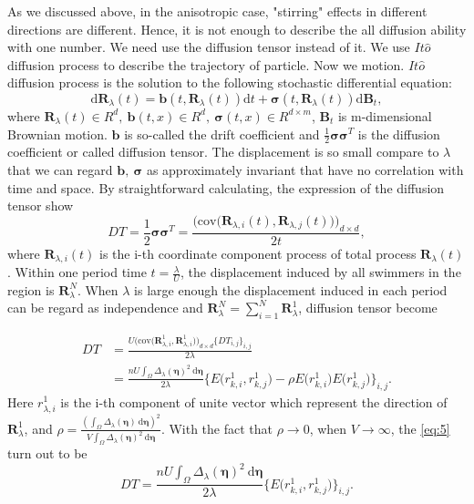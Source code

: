 \documentclass[12pt,a4paper]{article}
\begin{document}
As we discussed above, in the anisotropic case, "stirring" effects in
different directions are different. Hence, it is not enough to
describe the all diffusion ability with one number. We need use the
diffusion tensor instead of it. We use $It\hat{o}$ diffusion process
to describe the trajectory of particle. Now we motion. $It\hat{o}$
diffusion process is the solution to the following stochastic
differential equation:
\begin{equation}
  \label{eq:3}
  \mathrm{d}\bm{R}_{\lambda}(t)=\bm{b}(t,\bm{R}_{\lambda}(t))\mathrm{d}t+\bm{\sigma}(t,\bm{R}_{\lambda}(t))\mathrm{d}\bm{B}_{t},
\end{equation}
where $\bm{R}_{\lambda}(t)\in R^{d},\ \bm{b}(t,x)\in R^{d},\ \bm{\sigma}(t,x)\in R^{d\times
  m}$, $\bm{B}_{t}$ is m-dimensional Brownian motion. $\bm{b}$ is
so-called the drift coefficient and $\frac{1}{2}\bm{\sigma}\bm{\sigma}^{T}$ is
the diffusion coefficient or called diffusion tensor. The displacement
is so small compare to $\lambda$ that we can regard $\bm{b},\ \bm{\sigma}$ as
approximately invariant that have no correlation with time and
space. By straightforward calculating, the expression of the diffusion
tensor show
\begin{equation}
  \label{eq:4}
  DT=\frac{1}{2}\bm{\sigma}\bm{\sigma}^{T}=\frac{\Big(\mathrm{cov}\Big(\bm{R}_{\lambda,i}(t),
        \bm{R}_{\lambda,j}(t)\Big)\Big)_{d\times d}}{2t},
\end{equation}
where $\bm{R}_{\lambda,i}(t)$ is the i-th coordinate component process of
total process $\bm{R}_{\lambda}(t)$. Within one period time $t=\frac{\lambda}{U}$,
the displacement induced by all swimmers in the region is $\bm{R}_{\lambda}^{N}$.
When $\lambda$ is large enough the displacement induced in each period can
be regard as independence and
$\bm{R}_{\lambda}^{N}=\sum_{i=1}^{N}\bm{R}_{\lambda}^{1}$, diffusion tensor become

\begin{equation}
  \label{eq:5}
  \begin{aligned}
    DT&=\frac{U\Big(\mathrm{cov}\Big(\bm{R}_{\lambda,i}^{1},
          \bm{R}_{\lambda,i}^{1}\Big)\Big)_{d\times d}\{DT_{i,j}\}_{i,j}}{2\lambda}\\
      &=\frac{nU\int_{\Omega}\Delta_{\lambda}(\bm{\eta})^{2}\
        \mathrm{d}\bm{\eta}}{2\lambda}\{E\Big(r^{1}_{k,i},r^{1}_{k,j}\Big)
      -\rho E\Big(r^{1}_{k,i}\Big)E\Big(r_{k,j}^{1}\Big)\}_{i,j}.
  \end{aligned}
\end{equation}
Here $r^{1}_{\lambda,i}$ is the i-th component of unite vector which
represent the direction of $\bm{R}_{\lambda}^{1}$, and
\mbox{$\rho=\frac{(\int_{\Omega}\Delta_{\lambda}(\bm{\eta})\ 
    \mathrm{d}\bm{\eta})^{2}}{V\int_{\Omega}\Delta_{\lambda}(\bm{\eta})^{2}\ \mathrm{d}\bm{\eta}}$}.
With the fact that $\rho\to0$, when $V\to\infty$, the \eqref{eq:5} turn out to be
\begin{equation}
  \label{eq:6}
  DT=\frac{nU\int_{\Omega}\Delta_{\lambda}(\bm{\eta})^{2}\ \mathrm{d}\bm{\eta}}{2\lambda}\{E\Big(r^{1}_{k,i},r^{1}_{k,j}\Big)\}_{i,j}.
\end{equation}
\end{document}
